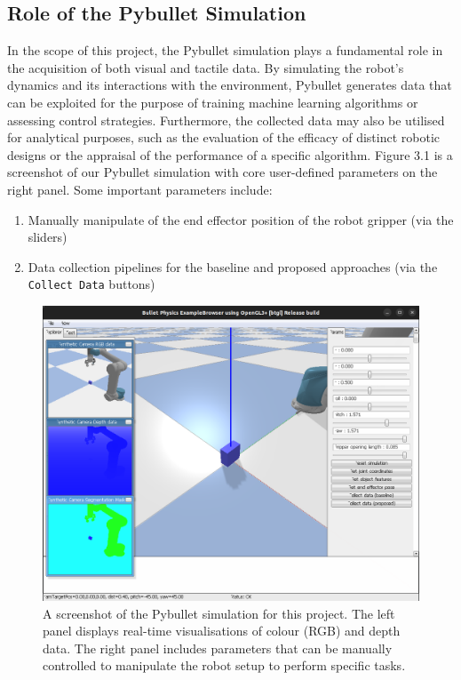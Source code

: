 \documentclass[11pt, a4paper]{report}
\begin{document}
\subsection{Role of the Pybullet Simulation}\label{sec:3.1.1}
In the scope of this project, the Pybullet simulation plays a fundamental role in the acquisition of both visual and tactile data. By simulating the robot's dynamics and its interactions with the environment, Pybullet generates data that can be exploited for the purpose of training machine learning algorithms or assessing control strategies. Furthermore, the collected data may also be utilised for analytical purposes, such as the evaluation of the efficacy of distinct robotic designs or the appraisal of the performance of a specific algorithm. Figure 3.1 is a screenshot of our Pybullet simulation with core user-defined parameters on the right panel. Some important parameters include:
\begin{enumerate}
    \item Manually manipulate of the end effector position of the robot gripper (via the sliders)
    \item Data collection pipelines for the baseline and proposed approaches (via the \verb|Collect Data| buttons)
\end{enumerate}

\begin{figure}[H]
    \centering
    \includegraphics[width=\textwidth]{docs/Project Report/Media/3_1_1_pybullet_sim.png}
    \caption{A screenshot of the Pybullet simulation for this project. The left panel displays real-time visualisations of colour (RGB) and depth data. The right panel includes parameters that can be manually controlled to manipulate the robot setup to perform specific tasks.}
    \label{fig:3.2}
\end{figure}
\end{document}
